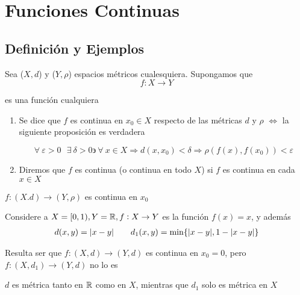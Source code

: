 \chapter{Funciones Continuas}

\section{Definición y Ejemplos}

\begin{definition} \label{def21}
    Sea ($X,d$) y ($Y,\rho$) espacios métricos cualesquiera. Supongamos que
    \begin{equation*}
        f : X \to Y 
    \end{equation*}

    es una función cualquiera

    \begin{enumerate}
        \item Se dice que $f$ es continua en ${x}_{0} \in X$ respecto de las métricas $d$ y $\rho$ $\iff$ la siguiente proposición es verdadera

        \begin{equation*}
            \forall \: \varepsilon > 0 \: \: \: \exists \: \delta > 0 \backepsilon \: \forall \: x \in X \Rightarrow d(x,{x}_{0}) < \delta \Rightarrow \rho(f(x),f({x}_{0})) < \varepsilon 
        \end{equation*}
        \item Diremos que $f$ es continua (o continua en todo $X$) si $f$ es continua en cada $x \in X$
    \end{enumerate}
\end{definition}

\begin{notation}
    $ f : (X.d) \to (Y, \rho) $ es continua en $x_0$
\end{notation}

\begin{eg}
    Considere a $X=[0,1), Y= \mathbb{R}, f : X \to Y$ es la función $f(x)=x$, y además
    \begin{align*}
        d(x,y) = \abs{x-y} &&&& {d}_{1}(x,y) = \min \{ \abs{x-y}, 1 - \abs{x-y}\}
    \end{align*}

    Resulta ser que $f:(X,d) \to (Y,d)$ es continua en $x_0 = 0$, pero $f:(X,{d}_{1}) \to (Y,d)$ no lo es
\end{eg}

\begin{remark}
    $d$ es métrica tanto en $\mathbb{R}$ como en $X$, mientras que $d_1$ solo es métrica en $X$
\end{remark}

